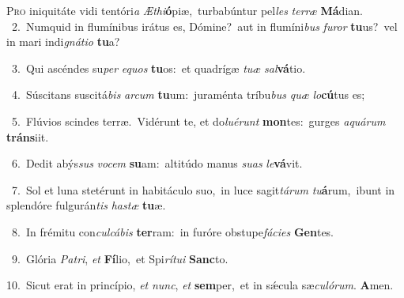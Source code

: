 \lettrine{\initial\textcolor{\initialcolor}{P}}{ro} iniquitáte vidi tentóri\textit{a} \textit{Æ}\-\textit{thi}\textbf{ó}piæ,~\star turbabúntur pel\textit{les} \textit{ter}\-\textit{ræ} \textbf{Má}\-dian.\\
{\numbfont\textcolor{\numbcolor}{~2.}}~Numquid in flumínibus irátus es, Dómine?~\dagger aut in flumíni\textit{bus} \textit{fu}\-\textit{ror} \textbf{tu}\-us?~\star vel in mari indi\-\textit{gná}\-\textit{ti}\textit{o} \textbf{tu}\-a?\par
{\numbfont\textcolor{\numbcolor}{~3.}}~Qui ascéndes su\textit{per} \textit{e}\-\textit{quos} \textbf{tu}\-os:~\star et quadrígæ \textit{tu}\-\textit{æ} \textit{sal}\-\textbf{vá}tio.\par
{\numbfont\textcolor{\numbcolor}{~4.}}~Súscitans suscitá\textit{bis} \textit{ar}\-\textit{cum} \textbf{tu}\-um:~\star juraménta tríbu\textit{bus} \textit{quæ} \textit{lo}\-\textbf{cú}tus es;\par
{\numbfont\textcolor{\numbcolor}{~5.}}~Flúvios scindes terræ.~\dagger Vidérunt te, et do\-\textit{lu}\-\textit{é}\textit{runt} \textbf{mon}\-tes:~\star gurges \textit{a}\-\textit{quá}\textit{rum} \textbf{tráns}\-iit.\par
{\numbfont\textcolor{\numbcolor}{~6.}}~Dedit abýs\textit{sus} \textit{vo}\-\textit{cem} \textbf{su}\-am:~\star altitúdo manus \textit{su}\-\textit{as} \textit{le}\-\textbf{vá}vit.\par
{\numbfont\textcolor{\numbcolor}{~7.}}~Sol et luna stetérunt in habitáculo suo,~\dagger in luce sagit\-\textit{tá}\-\textit{rum} \textit{tu}\-\textbf{á}rum,~\star ibunt in splendóre fulgurán\textit{tis} \textit{has}\-\textit{tæ} \textbf{tu}\-æ.\par
{\numbfont\textcolor{\numbcolor}{~8.}}~In frémitu con\-\textit{cul}\-\textit{cá}\textit{bis} \textbf{ter}\-ram:~\star in furóre obstupe\-\textit{fá}\-\textit{ci}\textit{es} \textbf{Gen}\-tes.\par
{\numbfont\textcolor{\numbcolor}{~9.}}~Glória \textit{Pa}\-\textit{tri}, \textit{et} \textbf{Fí}\-lio,~\star et Spi\-\textit{rí}\-\textit{tu}\textit{i} \textbf{Sanc}\-to.\par
{\numbfont\textcolor{\numbcolor}{10.}}~Sicut erat in princípio, \textit{et} \textit{nunc}\-, \textit{et} \textbf{sem}\-per,~\star et in sǽcula sæ\-\textit{cu}\-\textit{ló}\textit{rum}. \textbf{A}\-men.\par
